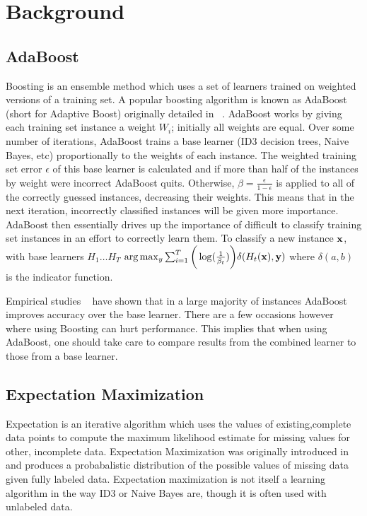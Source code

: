 \documentclass{sig-alternate}
\begin{document}
\section{Background}
\subsection{AdaBoost}
Boosting is an ensemble method which uses a set of learners trained on weighted versions of a training set. A popular boosting algorithm is known as AdaBoost (short for Adaptive Boost) originally detailed in ~\cite{Freund:1997:DGO:261540.261549}.  AdaBoost works by giving each training set instance a weight $W_{i}$; initially all weights are equal. Over some number of iterations, AdaBoost trains a base learner (ID3 decision trees, Naive Bayes, etc) proportionally to the weights of each instance. The weighted training set error $\epsilon$ of this base learner is calculated and if more than half of the instances by weight were incorrect AdaBoost quits.  Otherwise, $\beta=\frac{\epsilon}{1-\epsilon}$ is applied to all of the correctly guessed instances, decreasing their weights.  This means that in the next iteration, incorrectly classified instances will be given more importance.  AdaBoost then essentially drives up the importance of difficult to classify training set instances in an effort to correctly learn them.  To classify a new instance $\bf{x}$, with base learners $H_{1} \dots H_{T}$  $\arg \max_{y} \sum_{i=1}^{T}\bigg(\log(\frac{1}{\beta_{t}})\bigg) \delta(H_{t}(\bf{x}),y)$ where $\delta(a,b)$ is the indicator function.
 

Empirical studies ~\cite{dietterich1997machine} have shown that in a large majority of instances AdaBoost improves accuracy over the base learner.  There are a few occasions however where using Boosting can hurt performance.  This implies that when using AdaBoost, one should take care to compare results from the combined learner to those from a base learner.

\subsection{Expectation Maximization}
Expectation is an iterative algorithm which uses the values of existing,complete data points to compute the maximum likelihood estimate for missing values for other, incomplete data. Expectation Maximization was originally introduced in ~\cite{Dempster77maximumlikelihood} and produces a probabalistic distribution of the possible values of missing data given fully labeled data. Expectation maximization is not itself a learning algorithm in the way ID3 or Naive Bayes are, though it is often used with unlabeled data.
\end{document}
